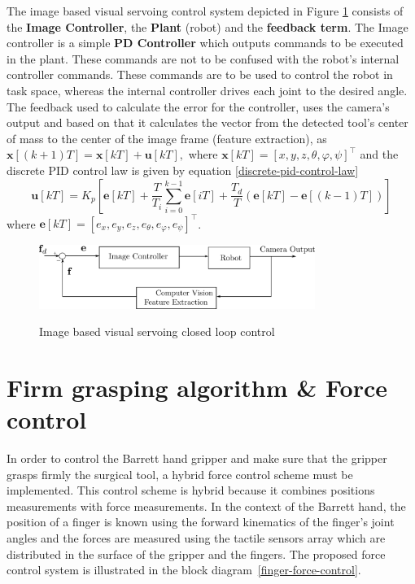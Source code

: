 The image based visual servoing control system depicted in Figure \ref{visual-servoing-image-based-control} consists of the \textbf{Image Controller}, the \textbf{Plant} (robot) and the \textbf{feedback term}. The Image controller is a simple 
\textbf{PD Controller} which outputs commands to be executed in the plant. These commands are not to be confused with the robot's internal controller commands. These commands are to be used to control the robot in task space, whereas the internal controller drives each joint to the desired angle. The feedback used to calculate the error for the controller, uses the camera's output and based on that it calculates the vector from the detected tool's center of mass to the center of the image frame (feature extraction), as
$
\mathbf{x}[(k+1)T] = \mathbf{x}[kT] + \mathbf{u}[kT], 
$
where $\mathbf{x}[kT] = [x, y, z, θ, φ, ψ]^\top$ and the discrete PID control law is given by equation \ref{discrete-pid-control-law}
\begin{equation}
\label{discrete-pid-control-law}
\mathbf{u}[kT] = K_p \left[ \mathbf{e}[kT] + \frac{T}{T_i} \sum_{i=0}^{k-1} \mathbf{e}[iT] + \frac{T_d}{T} \left( \mathbf{e}[kT] - \mathbf{e}[(k-1)T] \right) \right]
\end{equation}
where $\mathbf{e}[kT] = [e_x, e_y, e_z, e_θ, e_φ, e_ψ]^\top$.

\begin{center}
\begin{figure}[!htb]
\centering
\includegraphics[width=0.8\textwidth]{images/visual-servoing-image-based.png}\\
\caption{Image based visual servoing closed loop control}
\label{visual-servoing-image-based-control}
\end{figure}
\end{center}


\section{Firm grasping algorithm \& Force control}

In order to control the Barrett hand gripper and make sure that the gripper grasps firmly the surgical tool, a hybrid force control scheme must be implemented. This control scheme is hybrid because it combines positions measurements with force measurements. In the context of the Barrett hand, the position of a finger is known using the forward kinematics of the finger's joint angles and the forces are measured using the tactile sensors array which are distributed in the surface of the gripper and the fingers. The proposed force control system is illustrated in the block diagram~\ref{finger-force-control}.

